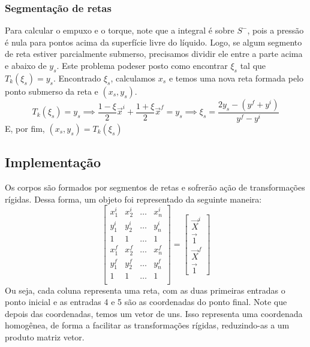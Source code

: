 \documentclass[
	12pt,				%
	oneside,			%
	a4paper,			%
	]{article}
\begin{document}
    \subsubsection{Segmentação de retas}
    Para calcular o empuxo e o torque, note que a integral é sobre $S^-$, pois a pressão é nula para pontos acima da superfície livre do líquido. Logo, se algum segmento de reta estiver parcialmente submerso, precisamos dividir ele entre a parte acima e abaixo de $y_s$. Este problema podeser posto como encontrar $\xi_s$ tal que $T_k(\xi_s) = y_s$. Encontrado $\xi_s$, calculamos $x_s$ e temos uma nova reta formada pelo ponto submerso da reta e $(x_s, y_s)$.
    \[
        T_k(\xi_s) = y_s \implies \frac{1-\xi}{2}\vec{x}^i + \frac{1 + \xi}{2} \vec{x}^f = y_s \implies \xi_s = \frac{2y_s - (y^f + y^i)}{y^f - y^i}
    \]
    E, por fim, $(x_s, y_s) = T_k(\xi_s)$
    \subsection{Implementação}
    Os corpos são formados por segmentos de retas e sofrerão ação de transformações rígidas. Dessa forma, um objeto foi representado da seguinte maneira:
    \[
        \begin{bmatrix}
            x^i_1 & x^i_2 & \dots & x^i_n \\
            y^i_1 & y^i_2 & \dots & y^i_n \\
            1     & 1     & \dots & 1 \\
            x^f_1 & x^f_2 & \dots & x^f_n \\
            y^f_1 & y^f_2 & \dots & y^f_n \\
            1     & 1     & \dots & 1 \\
        \end{bmatrix} = \begin{bmatrix}
            \vec{X}^i \\
            \vec{1} \\
            \vec{X}^f \\
            \vec{1}
        \end{bmatrix}
    \]
    Ou seja, cada coluna representa uma reta, com as duas primeiras entradas o ponto inicial e as entradas 4 e 5 são as coordenadas do ponto final. Note que depois das coordenadas, temos um vetor de uns. Isso representa uma coordenada homogênea, de forma a facilitar as transformações rígidas, reduzindo-as a um produto matriz vetor. 
\end{document}
